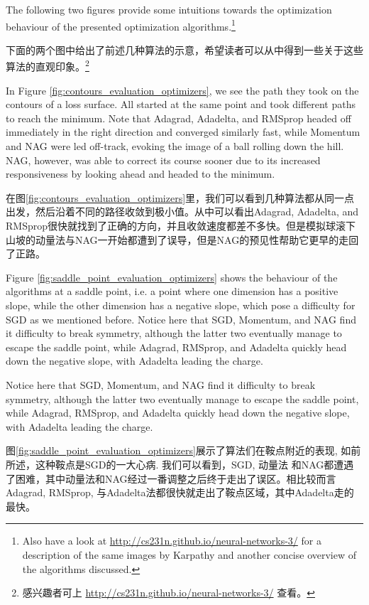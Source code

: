 \documentclass{article}
\begin{document}
The following two figures provide some intuitions towards the optimization behaviour of the presented optimization algorithms.\footnote{Also have a look at \url{http://cs231n.github.io/neural-networks-3/} for a description of the same images by Karpathy and another concise overview of the algorithms discussed.}

下面的两个图中给出了前述几种算法的示意，希望读者可以从中得到一些关于这些算法的直观印象。\footnote{感兴趣者可上 \url{http://cs231n.github.io/neural-networks-3/} 查看。}

In Figure \ref{fig:contours_evaluation_optimizers}, we see the path they took on the contours of a loss surface. All started at the same point and took different paths to reach the minimum. Note that Adagrad, Adadelta, and RMSprop headed off immediately in the right direction and converged similarly fast, while Momentum and NAG were led off-track, evoking the image of a ball rolling down the hill. NAG, however, was able to correct its course sooner due to its increased responsiveness by looking ahead and headed to the minimum.

在图\ref{fig:contours_evaluation_optimizers}里，我们可以看到几种算法都从同一点出发，然后沿着不同的路径收敛到极小值。从中可以看出Adagrad, Adadelta, and RMSprop很快就找到了正确的方向，并且收敛速度都差不多快。但是模拟球滚下山坡的动量法与NAG一开始都遭到了误导，但是NAG的预见性帮助它更早的走回了正路。

Figure \ref{fig:saddle_point_evaluation_optimizers} shows the behaviour of the algorithms at a saddle point, i.e. a point where one dimension has a positive slope, while the other dimension has a negative slope, which pose a difficulty for SGD as we mentioned before. Notice here that SGD, Momentum, and NAG find it difficulty to break symmetry, although the latter two eventually manage to escape the saddle point, while Adagrad, RMSprop, and Adadelta quickly head down the negative slope, with Adadelta leading the charge.

Notice here that SGD, Momentum, and NAG find it difficulty to break symmetry, although the latter two eventually manage to escape the saddle point, while Adagrad, RMSprop, and Adadelta quickly head down the negative slope, with Adadelta leading the charge.

图\ref{fig:saddle_point_evaluation_optimizers}展示了算法们在鞍点附近的表现, 如前所述，这种鞍点是SGD的一大心病. 我们可以看到，SGD, 动量法 和NAG都遭遇了困难，其中动量法和NAG经过一番调整之后终于走出了误区。相比较而言 Adagrad, RMSprop, 与Adadelta法都很快就走出了鞍点区域，其中Adadelta走的最快。
\end{document}
